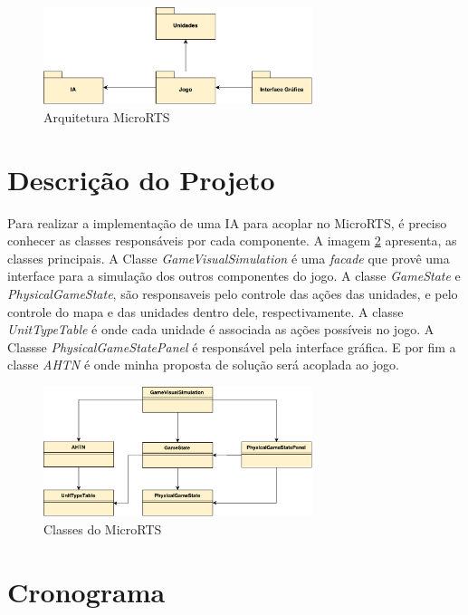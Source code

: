  \begin{figure}[ht]
 	\centering
 	\includegraphics[width=0.7\textwidth]{fig/pacotes.pdf}
 	\caption{Arquitetura MicroRTS}
 	\label{fig:pacotes}
 \end{figure} 
 
\section{Descrição do Projeto}
 
Para realizar a implementação de uma IA para acoplar no MicroRTS, é preciso conhecer as classes responsáveis por cada componente. A imagem \ref{fig:classes} apresenta, as classes principais. A Classe \textit{GameVisualSimulation} é uma \textit{facade} que provê uma interface para a simulação dos outros componentes do jogo. A classe \textit{GameState} e \textit{PhysicalGameState}, são responsaveis pelo controle das ações das unidades, e pelo controle do mapa e das unidades dentro dele, respectivamente. A classe \textit{UnitTypeTable} é onde cada unidade é associada as ações possíveis no jogo. A Classse \textit{PhysicalGameStatePanel} é responsável pela interface gráfica. E por fim a classe \textit{AHTN} é onde minha proposta de solução será acoplada ao jogo.
 
  \begin{figure}[ht]
  	\centering
  	\includegraphics[width=0.7\textwidth]{fig/classes.pdf}
  	\caption{Classes do MicroRTS}
  	\label{fig:classes}
  \end{figure} 


\section{Cronograma}

